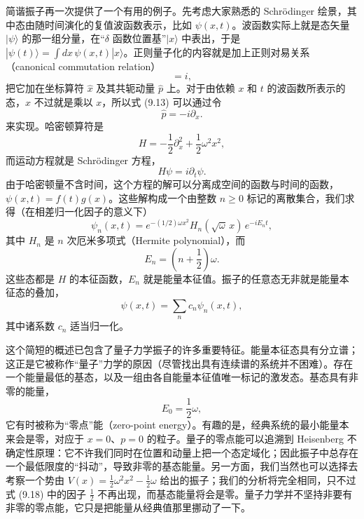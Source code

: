 简谐振子再一次提供了一个有用的例子。先考虑大家熟悉的 Schrödinger 绘景，其中态由随时间演化的复值波函数表示，比如 $\psi(x,t)$。波函数实际上就是态矢量 $|\psi\rangle$ 的那一组分量，在“$\delta$ 函数位置基”$|x\rangle$ 中表出，于是 $|\psi(t)\rangle = \int dx\,\psi(x,t)|x\rangle$。正则量子化的内容就是加上正则对易关系（canonical commutation relation）
\begin{equation*}
[\hat{x}, \hat{p}] = i,
\tag{9.13}
\end{equation*}
把它加在坐标算符 $\hat{x}$ 及其共轭动量 $\hat{p}$ 上。对于由依赖 $x$ 和 $t$ 的波函数所表示的态，$\hat{x}$ 不过就是乘以 $x$，所以式 (9.13) 可以通过令
\begin{equation*}
\hat{p} = -i\partial_x.
\tag{9.14}
\end{equation*}
来实现。哈密顿算符是
\begin{equation*}
H = -\frac{1}{2}\partial_x^2 + \frac{1}{2}\omega^2 x^2,
\tag{9.15}
\end{equation*}
而运动方程就是 Schrödinger 方程，
\begin{equation*}
H\psi = i\partial_t\psi.
\tag{9.16}
\end{equation*}
由于哈密顿量不含时间，这个方程的解可以分离成空间的函数与时间的函数，$\psi(x,t) = f(t)g(x)$。这些解构成一个由整数 $n \geq 0$ 标记的离散集合，我们求得（在相差归一化因子的意义下）
\begin{equation*}
\psi_n(x,t) = e^{-(1/2)\omega x^2} H_n(\sqrt{\omega}\,x)\, e^{-iE_n t},
\tag{9.17}
\end{equation*}
其中 $H_n$ 是 $n$ 次厄米多项式（Hermite polynomial），而
\begin{equation*}
E_n = \left(n + \frac{1}{2}\right)\omega.
\tag{9.18}
\end{equation*}
这些态都是 $H$ 的本征函数，$E_n$ 就是能量本征值。振子的任意态无非就是能量本征态的叠加，
\begin{equation*}
\psi(x,t) = \sum_n c_n \psi_n(x,t),
\tag{9.19}
\end{equation*}
其中诸系数 $c_n$ 适当归一化。

这个简短的概述已包含了量子力学振子的许多重要特征。能量本征态具有分立谱；这正是它被称作“量子”力学的原因（尽管找出具有连续谱的系统并不困难）。存在一个能量最低的基态，以及一组由各自能量本征值唯一标记的激发态。基态具有非零的能量，
\begin{equation*}
E_0 = \frac{1}{2}\omega,
\tag{9.20}
\end{equation*}
它有时被称为“零点”能（zero-point energy）。有趣的是，经典系统的最小能量本来会是零，对应于 $x = 0$、$p = 0$ 的粒子。量子的零点能可以追溯到 Heisenberg 不确定性原理：它不许我们同时在位置和动量上把一个态定域化；因此振子中总存在一个最低限度的“抖动”，导致非零的基态能量。另一方面，我们当然也可以选择去考察一个势由 $V(x) = \frac{1}{2}\omega^2 x^2 - \frac{1}{2}\omega$ 给出的振子；我们的分析将完全相同，只不过式 (9.18) 中的因子 $\frac{1}{2}$ 不再出现，而基态能量将会是零。量子力学并不坚持非要有非零的零点能，它只是把能量从经典值那里挪动了一下。

